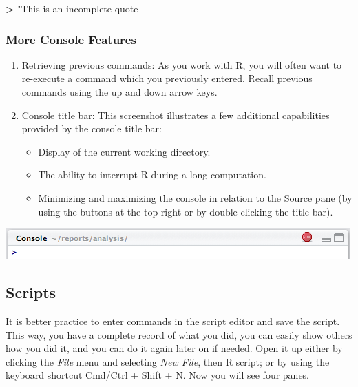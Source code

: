 \documentclass[]{book}
\newenvironment{Shaded}{\begin{snugshade}}{\end{snugshade}}
\newcommand{\StringTok}[1]{\textcolor[rgb]{0.31,0.60,0.02}{#1}}
\newcommand{\OperatorTok}[1]{\textcolor[rgb]{0.81,0.36,0.00}{\textbf{#1}}}
\providecommand{\tightlist}{%
  \setlength{\itemsep}{0pt}\setlength{\parskip}{0pt}}
\begin{document}
\begin{Shaded}
\begin{Highlighting}[]
\OperatorTok{>}\StringTok{ "This is an incomplete quote}
\StringTok{+}
\end{Highlighting}
\end{Shaded}

\subsubsection*{More Console Features}\label{more-console-features}

\begin{enumerate}
\def\labelenumi{\arabic{enumi}.}
\item
  Retrieving previous commands: As you work with R, you will often want
  to re-execute a command which you previously entered. Recall previous
  commands using the up and down arrow keys.
\item
  Console title bar: This screenshot illustrates a few additional
  capabilities provided by the console title bar:

  \begin{itemize}
  \tightlist
  \item
    Display of the current working directory.
  \item
    The ability to interrupt R during a long computation.
  \item
    Minimizing and maximizing the console in relation to the Source pane
    (by using the buttons at the top-right or by double-clicking the
    title bar).
  \end{itemize}
\end{enumerate}

\begin{center}\includegraphics[width=0.7\linewidth]{img/using_console_title_bar} \end{center}

\subsection{Scripts}\label{scripts}

It is better practice to enter commands in the script editor and save
the script. This way, you have a complete record of what you did, you
can easily show others how you did it, and you can do it again later on
if needed. Open it up either by clicking the \emph{File} menu and
selecting \emph{New File}, then R script; or by using the keyboard
shortcut Cmd/Ctrl + Shift + N. Now you will see four panes.
\end{document}
